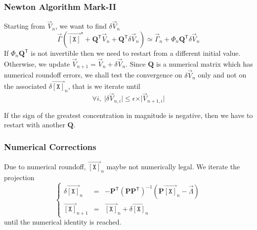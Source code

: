 \documentclass[aps,twocolumn]{revtex4}
\newcommand{\myconc}[1]{\left\lbrack #1 \right\rbrack}
\newcommand{\mychem}[1]{{\mathtt{#1}}}
\newcommand{\mymat}[1]{\boldsymbol{#1}}
\newcommand{\mytrn}[1]{{#1}^{\mathsf{T}}}
\newcommand{\myvec}[1]{\overrightarrow{#1}}
\newcommand{\vecX}{\myvec{\myconc{\mychem{X}}}}
\begin{document}
\subsubsection{Newton Algorithm Mark-II}
Starting from $\vec{V}_{n}$, we want to find $\delta\vec{V}_n$
\begin{equation}
	\vec{\Gamma}\left(\vecX^\star +  \mytrn{\mymat{Q}}\vec{V}_n + \mytrn{\mymat{Q}}\delta\vec{V}_n\right)
	\simeq \vec{\Gamma}_{n} + \Phi_n  \mytrn{\mymat{Q}} \delta\vec{V}_n
\end{equation}
If $\Phi_n  \mytrn{\mymat{Q}}$ is not invertible then we need to restart from a different initial value.\\
Otherwise, we update $\vec{V}_{n+1}= \vec{V}_{n} + \delta\vec{V}_{n}$.
Since $\mymat{Q}$ is a numerical matrix which has numerical roundoff errors, we shall test the convergence
 on $\delta\vec{V}_{n}$ only and not on the associated $\delta \vecX_n$, that is
we iterate until
\begin{equation}
	\forall i, \; \vert\delta\vec{V}_{n,i}\vert \leq \epsilon \times \vert \vec{V}_{n+1,i}\vert
\end{equation}

If the sign of the greatest concentration in magnitude is negative, then we have to restart with another $\mymat{Q}$.


\subsubsection{Numerical Corrections}
Due to numerical roundoff, $\vecX_n$ maybe not numerically legal.
We iterate the projection
\begin{equation}
	\left\lbrace
	\begin{array}{rcl}
	\delta \vecX_n & = & - \mytrn{\mymat{P}} \left(\mymat{P} \mytrn{\mymat{P}}\right)^{-1} \left( \mymat{P}\vecX_n - \vec{\Lambda} \right)\\
	\vecX_{n+1}    & = & \vecX_n + \delta\vecX_n
	\end{array}
	\right.
\end{equation}
until the numerical identity is reached.
\end{document}
